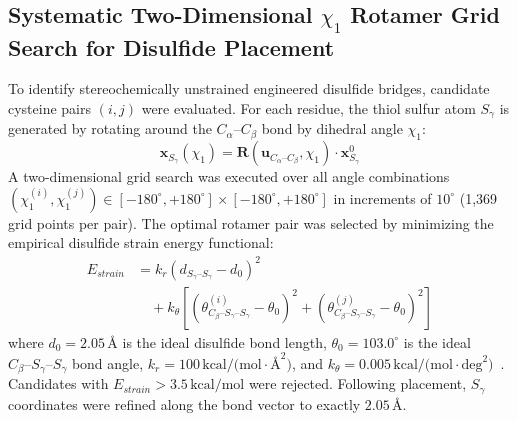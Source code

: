 \documentclass[10pt,twocolumn,a4paper]{article}
\begin{document}
\subsection{Systematic Two-Dimensional $\chi_1$ Rotamer Grid Search for Disulfide Placement}
To identify stereochemically unstrained engineered disulfide bridges, candidate cysteine pairs $(i, j)$ were evaluated. For each residue, the thiol sulfur atom $S_\gamma$ is generated by rotating around the $C_\alpha\text{--}C_\beta$ bond by dihedral angle $\chi_1$:
\begin{equation}
\mathbf{x}_{S_\gamma}(\chi_1) = \mathbf{R}(\mathbf{u}_{C_\alpha\text{--}C_\beta}, \chi_1) \cdot \mathbf{x}_{S_\gamma}^0
\end{equation}
A two-dimensional grid search was executed over all angle combinations $(\chi_1^{(i)}, \chi_1^{(j)}) \in [-180^\circ, +180^\circ] \times [-180^\circ, +180^\circ]$ in increments of $10^\circ$ (1,369 grid points per pair). The optimal rotamer pair was selected by minimizing the empirical disulfide strain energy functional:
\begin{align}
E_{strain} &= k_r \left( d_{S_\gamma\text{--}S_\gamma} - d_0 \right)^2 \nonumber \\
&\quad + k_\theta \left[ \left( \theta_{C_\beta\text{--}S_\gamma\text{--}S_\gamma}^{(i)} - \theta_0 \right)^2 + \left( \theta_{C_\beta\text{--}S_\gamma\text{--}S_\gamma}^{(j)} - \theta_0 \right)^2 \right]
\label{eq:ds_strain}
\end{align}
where $d_0 = 2.05\,\text{\AA}$ is the ideal disulfide bond length, $\theta_0 = 103.0^\circ$ is the ideal $C_\beta\text{--}S_\gamma\text{--}S_\gamma$ bond angle, $k_r = 100\,\text{kcal/(mol}\cdot\text{\AA}^2\text{)}$, and $k_\theta = 0.005\,\text{kcal/(mol}\cdot\text{deg}^2\text{)}$~\cite{Sowdhamini1989,Hogg2003}. Candidates with $E_{strain} > 3.5\,\text{kcal/mol}$ were rejected. Following placement, $S_\gamma$ coordinates were refined along the bond vector to exactly $2.05\,\text{\AA}$.
\end{document}

